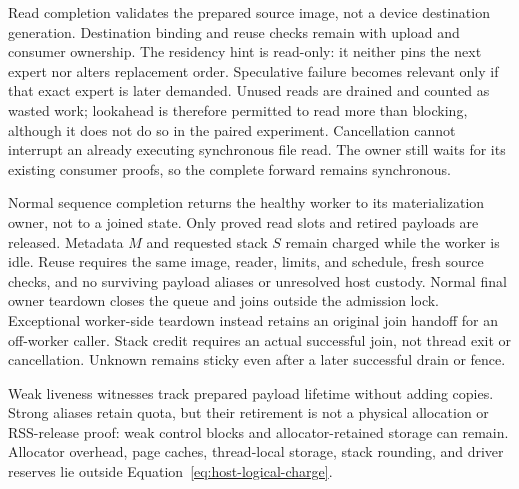 Read completion validates the prepared source image, not a device destination
generation. Destination binding and reuse checks remain with upload and
consumer ownership. The residency hint is read-only: it neither pins the next
expert nor alters replacement order. Speculative failure becomes relevant only if that exact
expert is later demanded. Unused reads are drained and counted as wasted
work; lookahead is therefore permitted to read more than blocking, although
it does not do so in the paired experiment. Cancellation cannot interrupt an
already executing synchronous file read. The owner still waits for its
existing consumer proofs, so the complete forward remains synchronous.

Normal sequence completion returns the healthy worker to its materialization
owner, not to a joined state. Only proved read slots and retired payloads are
released. Metadata $M$ and requested stack $S$ remain charged while the worker
is idle. Reuse requires the same image, reader, limits, and schedule, fresh
source checks, and no surviving payload aliases or unresolved host custody.
Normal final owner teardown closes the queue and joins outside the admission
lock. Exceptional worker-side teardown instead retains an original join
handoff for an off-worker caller. Stack credit requires an actual successful
join, not thread exit or cancellation. Unknown remains sticky even after a
later successful drain or fence.

Weak liveness witnesses track prepared payload lifetime without adding copies.
Strong aliases retain quota, but their retirement is not a physical allocation
or RSS-release proof: weak control blocks and allocator-retained storage can
remain. Allocator overhead, page caches, thread-local storage, stack rounding,
and driver reserves lie outside Equation~\ref{eq:host-logical-charge}.
